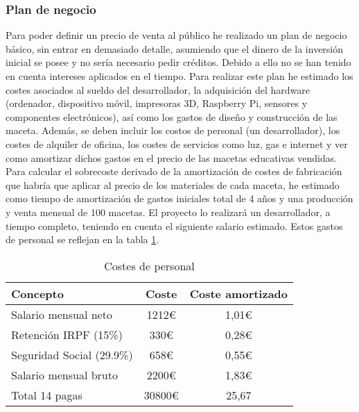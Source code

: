         \subsubsection{Plan de negocio}
        Para poder definir un precio de venta al público he realizado un plan de negocio básico, sin entrar en demasiado detalle, asumiendo que el dinero de la inversión inicial se posee y no sería necesario pedir créditos. Debido a ello no se han tenido en cuenta intereses aplicados en el tiempo. Para realizar este plan he estimado los costes asociados al sueldo del desarrollador, la adquisición del hardware (ordenador, dispositivo móvil, impresoras 3D, Raspberry Pi, sensores y componentes electrónicos), así como los gastos de diseño y construcción de las maceta. Además, se deben incluir los costos de personal (un desarrollador), los costes de alquiler de oficina, los costes de servicios como luz, gas e internet y ver como amortizar dichos gastos en el precio de las macetas educativas vendidas. Para calcular el sobrecoste derivado de la amortización de costes de fabricación que habría que aplicar al precio de los materiales de cada maceta, he estimado como tiempo de amortización de gastos iniciales total de 4 años y una producción y venta mensual de 100 macetas.
            El proyecto lo realizará un desarrollador, a tiempo completo, teniendo en cuenta el siguiente salario estimado. Estos gastos de personal se reflejan en la tabla \ref{tab:costes de personal de plan de negocio}.
            \begin{table}[H]
                \centering
                \caption{Costes de personal}
                \begin{tabular}{|l|c|c|}
                    \hline
                    Concepto & Coste & Coste amortizado\\
                    \hline
                    Salario mensual neto & 1212€ & 1,01€ \\
                    Retención IRPF (15\%) & 330€ & 0,28€ \\
                    Seguridad Social (29.9\%) & 658€ & 0,55€\\
                    \hline
                    Salario mensual bruto & 2200€ & 1,83€\\
                    \hline
                    Total 14 pagas & 30800€ & 25,67\\
                    \hline
                \end{tabular}
                \label{tab:costes de personal de plan de negocio}
            \end{table}
